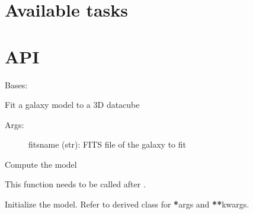 \documentclass[letterpaper,10pt,english]{sphinxmanual}
\begin{document}
\chapter{Available tasks}
\label{\detokenize{pybb_quickstart:pybbtasks}}\label{\detokenize{pybb_quickstart:available-tasks}}

\chapter{API}
\label{\detokenize{pybb_api::doc}}\label{\detokenize{pybb_api:api}}\label{\detokenize{pybb_api:module-pyBBarolo.pyBBarolo}}

\begin{fulllineitems}
\label{\detokenize{pybb_api:pyBBarolo.pyBBarolo.FitMod3D}}
Bases: {\hyperref[\detokenize{pybb_api:pyBBarolo.pyBBarolo.Model3D}]{}}

Fit a galaxy model to a 3D datacube
\begin{description}
\item[{Args:}] \leavevmode
fitsname (str): FITS file of the galaxy to fit

\end{description}

\begin{fulllineitems}
\label{\detokenize{pybb_api:pyBBarolo.pyBBarolo.FitMod3D.compute}}
Compute the model

This function needs to be called after {\hyperref[\detokenize{pybb_api:pyBBarolo.pyBBarolo.FitMod3D.init}]{}}.

\end{fulllineitems}


\begin{fulllineitems}
\label{\detokenize{pybb_api:pyBBarolo.pyBBarolo.FitMod3D.init}}
Initialize the model. Refer to derived class for {\color{red}\bfseries{}*}args and {\color{red}\bfseries{}**}kwargs.

\end{fulllineitems}


\end{fulllineitems}
\end{document}
